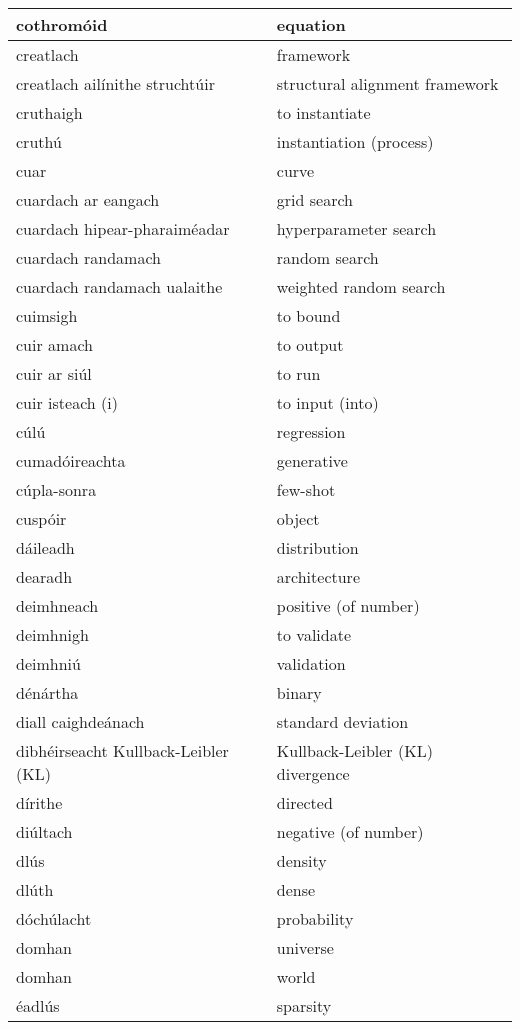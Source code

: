 \begin{longtable}{|l|l|}
		cothromóid&equation\\ \hline 
		creatlach&framework\\ \hline 
		creatlach ailínithe struchtúir&structural alignment framework\\ \hline 
		cruthaigh&to instantiate\\ \hline 
		cruthú&instantiation (process)\\ \hline 
		cuar&curve\\ \hline 
		cuardach ar eangach&grid search\\ \hline 
		cuardach hipear-pharaiméadar&hyperparameter search\\ \hline 
		cuardach randamach&random search\\ \hline 
		cuardach randamach ualaithe&weighted random search\\ \hline 
		cuimsigh&to bound\\ \hline 
		cuir amach&to output\\ \hline 
		cuir ar siúl&to run\\ \hline 
		cuir isteach (i)&to input (into)\\ \hline 
		cúlú&regression\\ \hline 
		cumadóireachta&generative\\ \hline 
		cúpla-sonra&few-shot\\ \hline 
		cuspóir&object\\ \hline 
		dáileadh&distribution\\ \hline 
		dearadh&architecture\\ \hline 
		deimhneach&positive (of number)\\ \hline 
		deimhnigh&to validate\\ \hline 
		deimhniú&validation\\ \hline 
		dénártha&binary\\ \hline 
		diall caighdeánach&standard deviation\\ \hline 
		dibhéirseacht Kullback-Leibler (KL)&Kullback-Leibler (KL) divergence\\ \hline 
		dírithe&directed\\ \hline 
		diúltach&negative (of number)\\ \hline 
		dlús&density\\ \hline 
		dlúth&dense\\ \hline 
		dóchúlacht&probability\\ \hline 
		domhan&universe\\ \hline 
		domhan&world\\ \hline 
		éadlús&sparsity\\ \hline 

\end{longtable}
